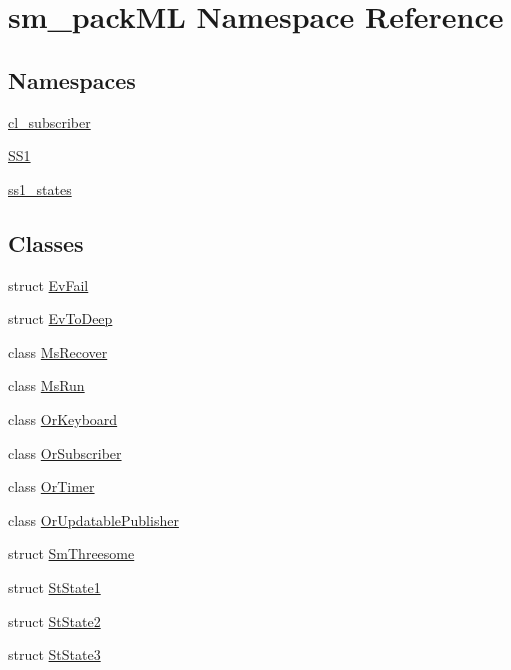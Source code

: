 \hypertarget{namespacesm__packML}{}\section{sm\+\_\+pack\+ML Namespace Reference}
\label{namespacesm__packML}
\subsection*{Namespaces}
\begin{DoxyCompactItemize}
\item 
 \hyperlink{namespacesm__packML_1_1cl__subscriber}{cl\+\_\+subscriber}
\item 
 \hyperlink{namespacesm__packML_1_1SS1}{S\+S1}
\item 
 \hyperlink{namespacesm__packML_1_1ss1__states}{ss1\+\_\+states}
\end{DoxyCompactItemize}
\subsection*{Classes}
\begin{DoxyCompactItemize}
\item 
struct \hyperlink{structsm__packML_1_1EvFail}{Ev\+Fail}
\item 
struct \hyperlink{structsm__packML_1_1EvToDeep}{Ev\+To\+Deep}
\item 
class \hyperlink{classsm__packML_1_1MsRecover}{Ms\+Recover}
\item 
class \hyperlink{classsm__packML_1_1MsRun}{Ms\+Run}
\item 
class \hyperlink{classsm__packML_1_1OrKeyboard}{Or\+Keyboard}
\item 
class \hyperlink{classsm__packML_1_1OrSubscriber}{Or\+Subscriber}
\item 
class \hyperlink{classsm__packML_1_1OrTimer}{Or\+Timer}
\item 
class \hyperlink{classsm__packML_1_1OrUpdatablePublisher}{Or\+Updatable\+Publisher}
\item 
struct \hyperlink{structsm__packML_1_1SmThreesome}{Sm\+Threesome}
\item 
struct \hyperlink{structsm__packML_1_1StState1}{St\+State1}
\item 
struct \hyperlink{structsm__packML_1_1StState2}{St\+State2}
\item 
struct \hyperlink{structsm__packML_1_1StState3}{St\+State3}
\end{DoxyCompactItemize}
